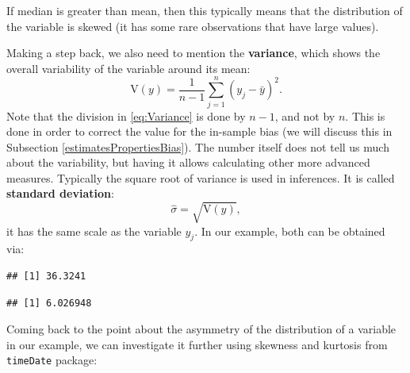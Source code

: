 \documentclass[
]{book}
\newenvironment{Shaded}{\begin{snugshade}}{\end{snugshade}}
\newcommand{\FunctionTok}[1]{\textcolor[rgb]{0.00,0.00,0.00}{#1}}
\newcommand{\NormalTok}[1]{#1}
\newcommand{\SpecialCharTok}[1]{\textcolor[rgb]{0.00,0.00,0.00}{#1}}
\theoremstyle{definition}
\theoremstyle{definition}
\theoremstyle{definition}
\theoremstyle{definition}
\theoremstyle{remark}
\begin{document}
If median is greater than mean, then this typically means that the distribution of the variable is skewed (it has some rare observations that have large values).

Making a step back, we also need to mention the \textbf{variance}, which shows the overall variability of the variable around its mean:
\begin{equation}
    \mathrm{V}(y)= \frac{1}{n-1}\sum_{j=1}^n (y_j - \bar{y})^2 .
    \label{eq:Variance}
\end{equation}
Note that the division in \eqref{eq:Variance} is done by \(n-1\), and not by \(n\). This is done in order to correct the value for the in-sample bias (we will discuss this in Subsection \ref{estimatesPropertiesBias}). The number itself does not tell us much about the variability, but having it allows calculating other more advanced measures. Typically the square root of variance is used in inferences. It is called \textbf{standard deviation}:
\begin{equation}
    \hat{\sigma} = \sqrt{\mathrm{V}(y)} ,
    \label{eq:StdDev}
\end{equation}
it has the same scale as the variable \(y_j\). In our example, both can be obtained via:

\begin{Shaded}
\end{Shaded}

\begin{verbatim}
## [1] 36.3241
\end{verbatim}

\begin{Shaded}
\end{Shaded}

\begin{verbatim}
## [1] 6.026948
\end{verbatim}

Coming back to the point about the asymmetry of the distribution of a variable in our example, we can investigate it further using skewness and kurtosis from \texttt{timeDate} package:

\begin{Shaded}
\end{Shaded}
\end{document}
